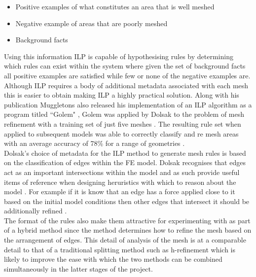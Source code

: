 \begin{itemize}
\item Positive examples  of what constitutes an area that is well meshed
\item Negative example of areas that are poorly meshed
\item Background facts
\end{itemize}

\noindent
Using this information ILP is capable of hypothesising rules by determining which rules can exist within the system where given the set of background facts all positive examples are satisfied while few or none of the negative examples are. Although ILP requires a body of additional metadata associated with each mesh this is easier to obtain making ILP a highly practical solution. Along with his publication Muggletons also released his implementation of an ILP algorithm as a program titled ``Golem" \cite{Golem}, Golem was applied by Dolsak to the problem of mesh refinement with a training set of just five meshes \cite{DolsakPaper94}. The resulting rule set when applied to subsequent models was able to correctly classify and re mesh areas with an average accuracy of 78\% for a range of geometries \cite{DolsakPaper94} \cite{appOfILPToFEMeshDesign}. \\

\noindent
Dolsak's choice of metadata for the ILP method to generate mesh rules is based on the classification of edges within the FE model. Dolsak recognises that edges act as an important intersections within the model and as such provide useful items of reference when designing heruristics with which to reason about the model \cite{DolsakPaper94} \cite{appOfILPToFEMeshDesign}.  For example if it is know that an edge has a force applied close to it based on the initial model conditions then other edges that intersect it should be additionally refined \cite{DolsakPaper91} \cite{appOfILPToFEMeshDesign}. \\ 

\noindent
The format of the rules also make them attractive for experimenting with as part of a hybrid method since the method determines how to refine the mesh based on the arrangement of edges. This detail of analysis of the mesh is at a comparable detail to that of a traditional splitting method such as h-refinement which is likely to improve the ease with which the two methods can be combined simultaneously in the latter stages of the project. \\ 

